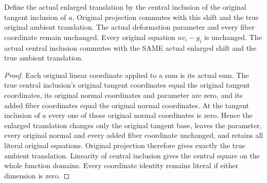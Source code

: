 \begin{lemma}
\label{hir:relative-normal-affine-dnc-coordinates}
\leanok
Define the actual enlarged translation by the central inclusion of the original tangent inclusion of $a$. Original projection commutes with this shift and the true original ambient translation. The actual deformation parameter and every fiber coordinate remain unchanged. Every original equation $uv_i-y_i$ is unchanged. The actual central inclusion commutes with the SAME actual enlarged shift and the true ambient translation.
\end{lemma}
\begin{proof}
Each original linear coordinate applied to a sum is its actual sum. The true central inclusion's original tangent coordinates equal the original tangent coordinates, its original normal coordinates and parameter are zero, and its added fiber coordinates equal the original normal coordinates. At the tangent inclusion of $a$ every one of those original normal coordinates is zero. Hence the enlarged translation changes only the original tangent base, leaves the parameter, every original normal and every added fiber coordinate unchanged, and retains all literal original equations. Original projection therefore gives exactly the true ambient translation. Linearity of central inclusion gives the central square on the whole function domains. Every coordinate identity remains literal if either dimension is zero.
\end{proof}

